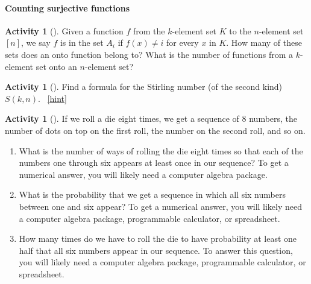 \documentclass[10pt,]{book}
\theoremstyle{plain}
\theoremstyle{definition}
\theoremstyle{definition}
\theoremstyle{definition}
\newtheorem{activity}[project]{Activity}
\numberwithin{equation}{chapter}
\begin{document}
\paragraph[{Counting surjective functions}]{Counting surjective functions}\hypertarget{paragraphs-7}{}
\begin{activity}[]\label{numontofun}
\hypertarget{p-1229}{}%
Given a function \(f\) from the \(k\)-element set \(K\) to the \(n\)-element set \([n]\), we say \(f\) is in the set \(A_i\) if \(f(x)\not= i\) for every \(x\) in \(K\). How many of these  sets does an onto function belong to? What is the number of functions from a \(k\)-element set onto an \(n\)-element set?%
\end{activity}
\begin{activity}[]\label{act_stirlingpie}
\hypertarget{p-1231}{}%
Find a formula for the Stirling number (of the second kind) \(S(k,n)\).%
~\hfill{\tiny\hyperlink{a-231}{[hint]}\hypertarget{q-231}{}}\end{activity}
\begin{activity}[]\label{activity-225}
\hypertarget{p-1234}{}%
If we roll a die eight times, we get a sequence of 8 numbers, the number of dots on top on the first roll, the number on the second roll, and so on.%
\begin{enumerate}[font=\bfseries,label=(\alph*),ref=\alph*]
\item\label{task-232} \hypertarget{p-1235}{}%
What is the number of ways of rolling the die eight times so that each of the numbers one through six appears at least once in our sequence? To get a numerical answer, you will likely need a computer algebra package.%
\item\label{task-233} \hypertarget{p-1237}{}%
What is the probability that we get a sequence in which all six numbers between one and six appear? To get a numerical answer, you will likely need a computer algebra package, programmable calculator, or spreadsheet.%
\item\label{task-234} \hypertarget{p-1239}{}%
How many times do we have to roll the die to have probability at least one half that all six numbers appear in our sequence. To answer this question, you will likely need a computer algebra package, programmable calculator, or spreadsheet.%
\end{enumerate}
\end{activity}
\typeout{************************************************}
\typeout{************************************************}
\end{document}
